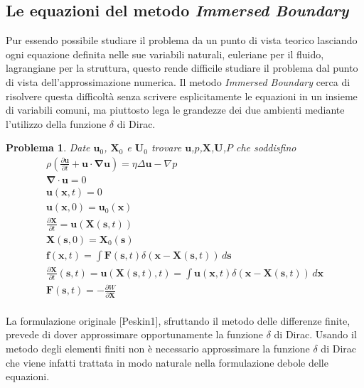 \documentclass{book}
\newtheorem{problem}[theorem]{Problema}
\newcommand{\Nabla}{\boldsymbol{\nabla}}
\newcommand{\IB}{\textit{Immersed Boundary}}
\begin{document}
\subsection{Le equazioni del metodo \IB}
Pur essendo possibile studiare il problema da un punto di vista teorico lasciando ogni equazione definita nelle sue variabili naturali, euleriane per il fluido, lagrangiane per la struttura, questo rende difficile studiare il problema dal punto di vista dell'approssimazione numerica. Il metodo \emph{Immersed Boundary} cerca di risolvere questa difficoltà senza scrivere esplicitamente le equazioni in un insieme di variabili comuni, ma piuttosto lega le grandezze dei due ambienti mediante l'utilizzo della funzione $\delta$ di Dirac.
\begin{problem}
Date $\mathbf{u}_0$, $\mathbf{X}_0$ e $\mathbf{U}_0$ trovare $\mathbf{u}$,$p$,$\mathbf{X}$,$\mathbf{U}$,$P$ che soddisfino
\begin{equation}
\begin{aligned}
\rho \left ( \frac{\partial \mathbf{u}}{\partial t} + \mathbf{u} \cdot \Nabla \mathbf{u} \right ) = \eta \Delta \mathbf{u} - \nabla p \\
\Nabla \cdot \mathbf{u} = 0 \\
\mathbf{u}(\mathbf{x},t)=0 \\
\mathbf{u}(\mathbf{x},0)=\mathbf{u}_0(\mathbf{x}) \\
\frac{\partial \mathbf{X}}{\partial t} = \mathbf{u}(\mathbf{X}(\mathbf{s},t))\\
\mathbf{X}(\mathbf{s},0)=\mathbf{X}_0(\mathbf{s})\\
\mathbf{f}(\mathbf{x},t)=\int \mathbf{F}(\mathbf{s},t)\delta(\mathbf{x}-\mathbf{X}(\mathbf{s},t))\,d\mathbf{s}\\
\frac{\partial\mathbf{X}}{\partial t}(\mathbf{s},t)=\mathbf{u}(\mathbf{X}(\mathbf{s},t),t)=\int \mathbf{u}(\mathbf{x},t)\delta(\mathbf{x}-\mathbf{X}(\mathbf{s},t))\,d\mathbf{x}\\
\mathbf{F}(\mathbf{s},t)=-\frac{\partial W}{\partial \mathbf{X}}\\
\end{aligned}
\end{equation}
\end{problem}
La formulazione originale [Peskin1], sfruttando il metodo delle differenze finite, prevede di dover approssimare opportunamente la funzione $\delta$ di Dirac. Usando il metodo degli elementi finiti non è necessario approssimare la funzione $\delta$ di Dirac che viene infatti trattata in modo naturale nella formulazione debole delle equazioni.
\end{document}
